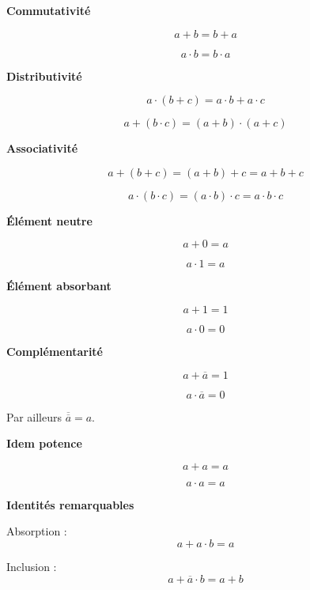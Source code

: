 \documentclass[10pt,fleqn]{article} %
\begin{document}
\begin{prop}
\textbf{Commutativité}

\begin{minipage}[c]{.45\linewidth}
$$ a+b = b+a$$
\end{minipage}\hfill
\begin{minipage}[c]{.45\linewidth}
$$ a\cdot b = b\cdot a$$
\end{minipage}

\textbf{Distributivité}

\begin{minipage}[c]{.45\linewidth}
$$ a\cdot (b+c) = a\cdot b+a \cdot c$$
\end{minipage}\hfill
\begin{minipage}[c]{.45\linewidth}
$$ a+(b\cdot c) = (a+b) \cdot (a+c)$$
\end{minipage}

\textbf{Associativité}

\begin{minipage}[c]{.45\linewidth}
$$ a + (b+c) = (a+b)+c = a+b+c$$
\end{minipage}\hfill
\begin{minipage}[c]{.45\linewidth}
$$ a \cdot (b\cdot c) = (a\cdot b)\cdot c = a \cdot b\cdot c$$
\end{minipage}

\textbf{Élément neutre}

\begin{minipage}[c]{.45\linewidth}
$$ a + 0 = a$$
\end{minipage}\hfill
\begin{minipage}[c]{.45\linewidth}
$$ a\cdot 1 = a$$
\end{minipage}

\textbf{Élément absorbant}

\begin{minipage}[c]{.45\linewidth}
$$ a + 1 = 1$$
\end{minipage}\hfill
\begin{minipage}[c]{.45\linewidth}
$$ a\cdot 0 = 0$$
\end{minipage}

\textbf{Complémentarité}

\begin{minipage}[c]{.45\linewidth}
$$ a + \overline{a} = 1$$
\end{minipage}\hfill
\begin{minipage}[c]{.45\linewidth}
$$ a\cdot \overline{a} = 0$$
\end{minipage}

Par ailleurs $\overline{\overline{a}}=a$.

\textbf{Idem potence}

\begin{minipage}[c]{.45\linewidth}
$$ a + a = a$$
\end{minipage}\hfill
\begin{minipage}[c]{.45\linewidth}
$$ a\cdot a = a$$
\end{minipage}

\textbf{Identités remarquables}

Absorption : 
$$ a + a\cdot b = a$$

Inclusion :
$$
a+\overline{a}\cdot b = a+b
$$
\end{prop}
\end{document}
